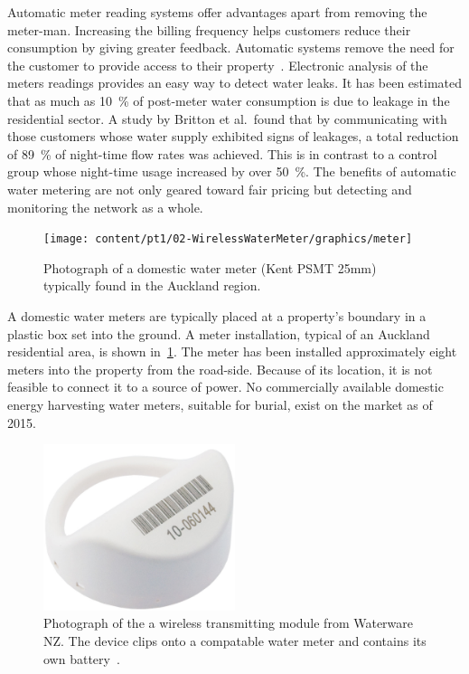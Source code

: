   Automatic meter reading systems offer advantages apart from removing the meter-man.
  Increasing the billing frequency helps customers reduce their consumption by giving greater feedback.
  Automatic systems remove the need for the customer to provide access to their property~\cite{Chang2012}.
  Electronic analysis of the meters readings provides an easy way to detect water leaks.
  It has been estimated that as much as \SI{10}{\percent} of post-meter water consumption is due to leakage in the residential sector.
  A study by Britton et al.\ found that by communicating with those customers whose water supply exhibited signs of leakages, a total reduction of  \SI{89}{\percent} of night-time flow rates was achieved.
  This is in contrast to a control group whose night-time usage increased by over \SI{50}{\percent}.
  The benefits of automatic water metering are not only geared toward fair pricing but detecting and monitoring the network as a whole.

  \begin{figure}
    \centering
    \texttt{[image: content/pt1/02-WirelessWaterMeter/graphics/meter]}
    \caption{\label{fig:Photo_DomesticWaterMeter}Photograph of a domestic water meter (Kent PSMT 25mm) typically found in the Auckland region.}
  \end{figure}

  A domestic water meters are typically placed at a property's boundary in a plastic box set into the ground.
  A meter installation, typical of an Auckland residential area, is shown in~\cref{fig:Photo_DomesticWaterMeter}.
  The meter has been installed approximately eight meters into the property from the road-side.
  Because of its location, it is not feasible to connect it to a source of power.
  No commercially available domestic energy harvesting water meters, suitable for burial, exist on the market as of 2015.

  \begin{figure}
    \centering
    \includegraphics[width=0.5\textwidth]{content/pt1/02-WirelessWaterMeter/graphics/hydro-WMBUSWLESSM}
    \caption{
      \label{fig:Photo_waterwareMeter}
      Photograph of the a wireless transmitting module from Waterware NZ.
      The device clips onto a compatable water meter and contains its own battery~\cite{BMeters2014}.
    }
  \end{figure}

